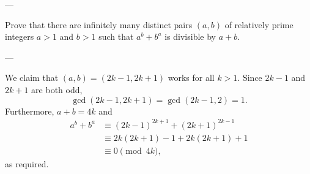 
---

Prove that there are infinitely many distinct pairs $(a, b)$ of relatively prime integers $a>1$ and $b>1$ such that $a^b+b^a$ is divisible by $a+b$.

---

We claim that $(a,b)=(2k-1,2k+1)$ works for all $k>1$. Since $2k-1$ and $2k+1$ are both odd, \[\gcd(2k-1,2k+1)=\gcd(2k-1,2)=1.\]
Furthermore, $a+b=4k$ and
\begin{align*}
    a^b+b^a&\equiv(2k-1)^{2k+1}+(2k+1)^{2k-1}\\
    &\equiv 2k(2k+1)-1+2k(2k+1)+1\\
    &\equiv 0\pmod{4k},
\end{align*}
as required.
